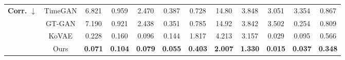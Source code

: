 \documentclass{article}
\theoremstyle{plain}
\theoremstyle{definition}
\theoremstyle{remark}
\begin{document}
{\begin{table*}[!t]
{\begin{tabular}{cc|cccccccccc}
    \multirow{4}{*}{\textbf{Corr.} $\downarrow$} 
      & TimeGAN 
         & 6.821 
         & 0.959 
         & 2.470 
         & 0.387 
         & 0.728
         & 14.80 
         & 3.848 
         & 3.051 
         & 3.354 
         & 0.867 \\
      & GT-GAN  
         & 7.190 
         & 0.921 
         & 2.438 
         & 0.351 
         & 0.785 
         & 14.92 
         & 3.842 
         & 3.502 
         & 0.254 
         & 0.809 \\
      & KoVAE   
         & 0.228 
         & 0.160 
         & 0.096 
         & 0.144 
         & 1.817 
         & 4.213 
         & 3.157 
         & 0.029 
         & 0.095 
         & 0.566 \\
      & Ours    
         & \cellcolor{blue!10}\textbf{0.071}
         & \cellcolor{blue!10}\textbf{0.104}
         & \cellcolor{blue!10}\textbf{0.079}
         & \cellcolor{blue!10}\textbf{0.055}
         & \cellcolor{blue!10}\textbf{0.403} 
         & \cellcolor{blue!10}\textbf{2.007}
         & \cellcolor{blue!10}\textbf{1.330}
         & \cellcolor{blue!10}\textbf{0.015}
         & \cellcolor{blue!10}\textbf{0.037}
         & \cellcolor{blue!10}\textbf{0.348} \\
    \bottomrule
\end{tabular}
}
\end{table*}


\begin{table*}[!t]
\centering
\setlength{\tabcolsep}{12pt} %
\caption{
Evaluation metrics for irregular time series with 96 sequence length (30\%, 50\%, 70\% drop).
Arrows ($\uparrow/\downarrow$) indicate whether higher or lower values are better.
}
\label{tab:irregular_96}
\end{table*}}
\end{document}
